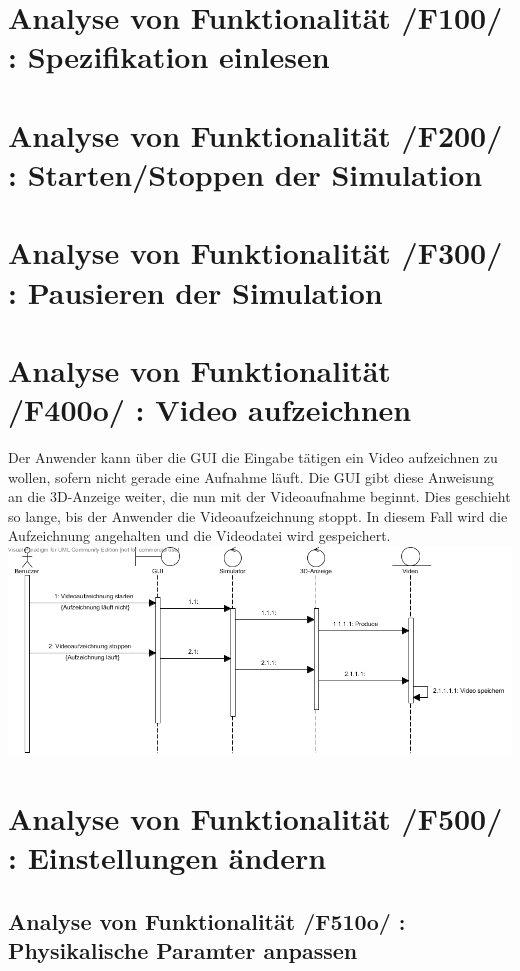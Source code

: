 \section{Analyse von Funktionalität /F100/ :  Spezifikation einlesen }
\section{Analyse von Funktionalität /F200/ :  Starten/Stoppen der Simulation}
\section{Analyse von Funktionalität /F300/ :  Pausieren der Simulation}
\section{Analyse von Funktionalität /F400o/ :  Video aufzeichnen}
Der Anwender kann über die GUI die Eingabe tätigen ein Video aufzeichnen zu wollen, sofern nicht gerade eine Aufnahme läuft. Die GUI gibt diese Anweisung an die 3D-Anzeige weiter, die nun mit der
Videoaufnahme beginnt. Dies geschieht so lange, bis der Anwender die Videoaufzeichnung stoppt. In diesem Fall wird die Aufzeichnung angehalten und die Videodatei wird gespeichert.
\includegraphics[width=16cm]{bilder/Video_aufzeichnen}
\section{Analyse von Funktionalität /F500/ :  Einstellungen ändern}
\subsection{Analyse von Funktionalität /F510o/ :  Physikalische Paramter anpassen}

